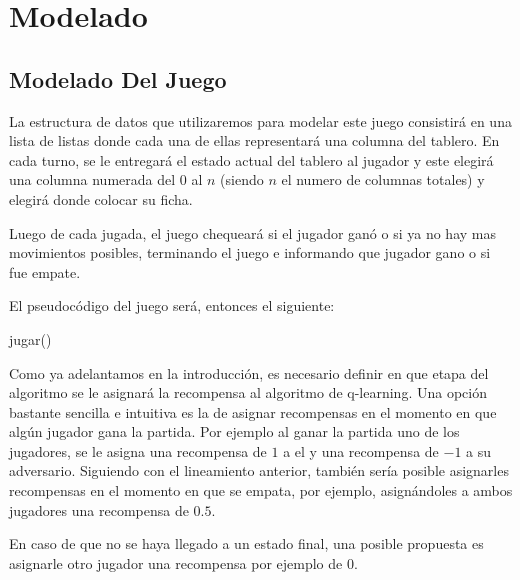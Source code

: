 \section{Modelado}

\subsection{Modelado Del Juego}

La estructura de datos que utilizaremos para modelar este juego consistirá en una lista de listas donde cada una de ellas representará una columna del tablero. En cada turno, se le entregará el estado actual del tablero al jugador y este elegirá una columna numerada del $0$ al $n$ (siendo $n$ el numero de columnas totales) y elegirá donde colocar su ficha.

Luego de cada jugada, el juego chequeará si el jugador ganó o si ya no hay mas movimientos posibles, terminando el juego e informando que jugador gano o si fue empate.

El pseudocódigo del juego será, entonces el siguiente:

\begin{algorithm}[h!]
\begin{algorithmic}[1]\parskip=1mm
 \caption{jugar()}
\end{algorithmic}
\end{algorithm}

Como ya adelantamos en la introducción, es necesario definir en que etapa del algoritmo se le asignará la recompensa al algoritmo de q-learning. Una opción bastante sencilla e intuitiva es la de asignar recompensas en el momento en que algún jugador gana la partida. Por ejemplo al ganar la partida uno de los jugadores, se le asigna una recompensa de $1$ a el y una recompensa de $-1$ a su adversario. Siguiendo con el lineamiento anterior, también sería posible asignarles recompensas en el momento en que se empata, por ejemplo, asignándoles a ambos jugadores una recompensa de $0.5$.

En caso de que no se haya llegado a un estado final, una posible propuesta es asignarle otro jugador una recompensa por ejemplo de $0$.

